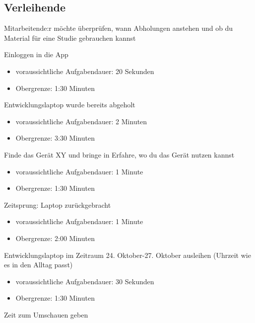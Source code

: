 \subsection{Verleihende}
{\sffamily\color{maincolor}{Szenario:}} Mitarbeitende:r möchte überprüfen, wann Abholungen anstehen und ob du Material für eine Studie gebrauchen kannst
\begin{compactenum}
    \item Einloggen in die App
            \begin{itemize}
                \item voraussichtliche Aufgabendauer: 20 Sekunden
                \item Obergrenze: 1:30 Minuten
            \end{itemize}
    \item Entwicklungslaptop wurde bereits abgeholt
            \begin{itemize}
                \item voraussichtliche Aufgabendauer: 2 Minuten
                \item Obergrenze: 3:30 Minuten
            \end{itemize}
    \item Finde das Gerät XY und bringe in Erfahre, wo du das Gerät nutzen kannst
            \begin{itemize}
                \item voraussichtliche Aufgabendauer: 1 Minute
                \item Obergrenze: 1:30 Minuten
            \end{itemize}
    \item Zeitsprung: Laptop zurückgebracht
            \begin{itemize}
                \item voraussichtliche Aufgabendauer: 1 Minute
                \item Obergrenze: 2:00 Minuten
            \end{itemize}
    \item Entwicklungslaptop im Zeitraum 24. Oktober-27. Oktober ausleihen (Uhrzeit wie es in den Alltag passt)
            \begin{itemize}
                \item voraussichtliche Aufgabendauer: 30 Sekunden
                \item Obergrenze: 1:30 Minuten
            \end{itemize}
    \item Zeit zum Umschauen geben
\end{compactenum}

